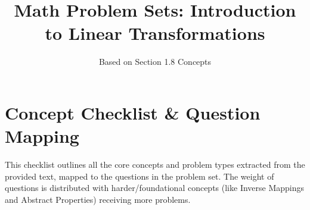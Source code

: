 \documentclass{article}
\title{Math Problem Sets: Introduction to Linear Transformations}
\author{Based on Section 1.8 Concepts}
\date{}
\begin{document}
\maketitle
\tableofcontents
\newpage

\section{Concept Checklist \& Question Mapping}
This checklist outlines all the core concepts and problem types extracted from the provided text, mapped to the questions in the problem set. The weight of questions is distributed with harder/foundational concepts (like Inverse Mappings and Abstract Properties) receiving more problems.
\end{document}
